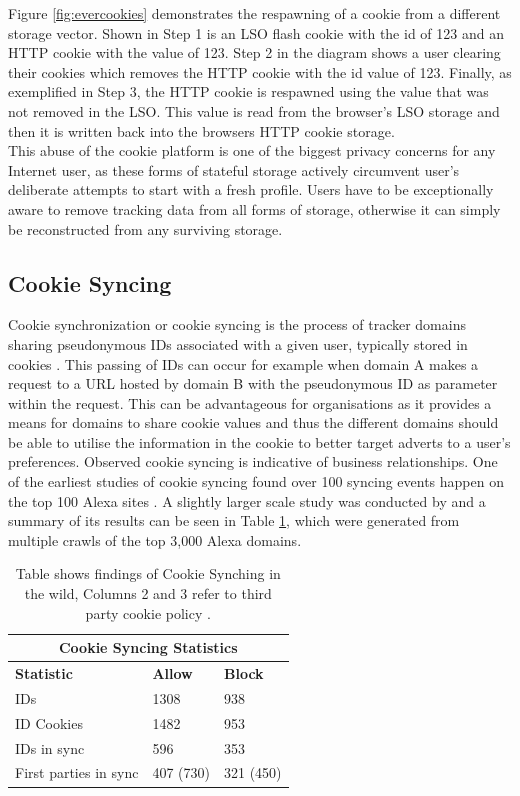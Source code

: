 \documentclass[12pt]{article}
\begin{document}
Figure \ref{fig:evercookies} demonstrates the respawning of a cookie from a different storage vector. Shown in Step 1 is an LSO flash cookie with the id of 123 and an HTTP cookie with the value of 123. Step 2 in the diagram shows a user clearing their cookies which removes the HTTP cookie with the id value of 123. Finally, as exemplified in Step 3, the HTTP cookie is respawned using the value that was not removed in the LSO. This value is read from the browser's LSO storage and then it is written back into the browsers HTTP cookie storage. \\

This abuse of the cookie platform is one of the biggest privacy concerns for any Internet user, as these forms of stateful storage actively circumvent user's deliberate attempts to start with a fresh profile. Users have to be exceptionally aware to remove tracking data from all forms of storage, otherwise it can simply be reconstructed from any surviving storage. 

\subsection{Cookie Syncing}
Cookie synchronization or cookie syncing is the process of tracker domains sharing pseudonymous IDs associated with a given user, typically stored in cookies \parencite{webNeverForgets}. This passing of IDs can occur for example when domain A makes a request to a URL hosted by domain B with the pseudonymous ID as parameter within the request. This can be advantageous for organisations as it provides a means for domains to share cookie values and thus the different domains should be able to utilise the information in the cookie to better target adverts to a user's preferences. Observed cookie syncing is indicative of business relationships.  One of the earliest studies of cookie syncing found over 100 syncing events happen on the top 100 Alexa sites \parencite{sellingPrivacy}. A slightly larger scale study was conducted by \parencite{webNeverForgets} and a summary of its results can be seen in Table \ref{table:1}, which were generated from multiple crawls of the top 3,000 Alexa domains. \\

{
\begin{table} [H]
\centering
\begin{tabular}{ |p{4cm}|p{4cm}|p{4cm}|  }
\hline
\multicolumn{3}{|c|}{\textbf{Cookie Syncing Statistics}} \\
\hline
\textbf{Statistic} & \textbf{Allow} & \textbf{Block} \\
\hline
IDs & 1308 & 938 \\
\hline
ID Cookies & 1482   & 953 \\
\hline
IDs in sync & 596 & 353 \\
\hline
First parties in sync & 407 (730) & 321 (450) \\
\hline
\end{tabular}
\caption{Table shows findings of Cookie Synching in the wild, Columns 2 and 3 refer to third party cookie policy \parencite{webNeverForgets}.}
\label{table:1}
\end{table}
}
\end{document}

